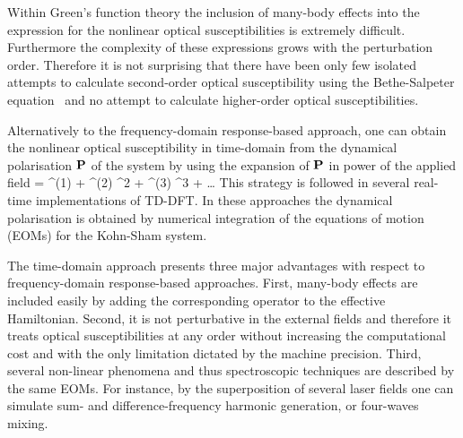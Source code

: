 Within Green's function theory the inclusion of many-body effects into the expression for the nonlinear optical susceptibilities is extremely difficult. 
Furthermore the complexity of these expressions grows with the perturbation order. Therefore it is not surprising that there have been only few isolated attempts to calculate second-order optical susceptibility using the Bethe-Salpeter equation~\cite{Leitsmann2005,Chang2002} and no attempt to calculate higher-order optical susceptibilities.~\cite{PhysRevB.80.165318} 

Alternatively to the frequency-domain response-based approach, one can obtain the nonlinear optical susceptibility in time-domain from the dynamical polarisation ${\bf P}$ of the system by using the expansion of ${\bf P}$ in power of the applied field
\be
\label{eq:peopbf}
\PP= \chi^{(1)} \efield + \chi^{(2)} \efield^2 + \chi^{(3)} \efield^3 + \dots 
\ee 
This strategy is followed in several real-time implementations of TD-DFT\cite{PhysRevB.54.4484}. In these approaches the dynamical polarisation is obtained by numerical integration of the equations of motion (EOMs) for the Kohn-Sham system.\cite{takimoto:154114,castro:3425,meng:054110} %

 
The time-domain approach presents three major advantages with respect to frequency-domain response-based approaches. First, many-body effects are included easily by adding the corresponding operator to the effective Hamiltonian. Second, it is not perturbative in the external fields and therefore it treats optical susceptibilities at any order without increasing the computational cost and with the only limitation dictated by the machine precision. Third, several non-linear phenomena and thus spectroscopic techniques are described by the same EOMs. For instance, by the superposition of several laser fields one can simulate sum- and difference-frequency harmonic generation, or four-waves mixing.\cite{boyd}

